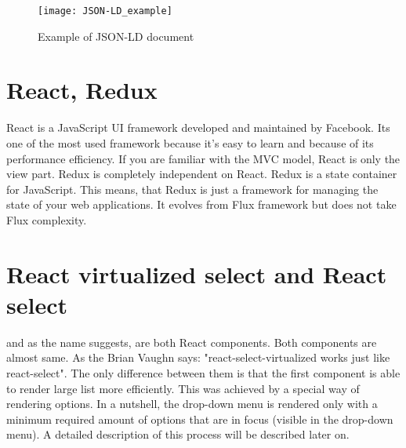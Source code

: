 \begin{figure}[th]
    \centering
    \texttt{[image: JSON-LD\_example]}
    \decoRule
    \caption[JSON-LD document]{Example of JSON-LD document}
    \label{fig:JSON-LD_document}
 \end{figure}


\section{React, Redux}

React \parencite{react} is a JavaScript UI framework developed and maintained by Facebook. Its one of the most used framework because it's easy to learn and because of its performance efficiency. If
you are familiar with the MVC model\parencite{MVC}, React is only the view part. Redux \parencite{Redux} is completely independent on React. Redux is a state container for JavaScript. This means, that Redux is just a framework for managing the state of your web applications. It evolves from Flux \parencite{Flux} framework but does not take Flux complexity.


\section{React virtualized select and React select}

\cite{react-virtualized-select} and \cite{react-select} as the name suggests, are both
React components. Both components are almost same.  As the Brian Vaughn says: 
"react-select-virtualized works just like react-select". The only difference between them 
is that the first component is able to render large list more efficiently. This was 
achieved by a special way of rendering options. In a nutshell, the drop-down menu is 
rendered only with a minimum required amount of options that are in focus (visible in 
the drop-down menu). A detailed description of this process will be described later on.

